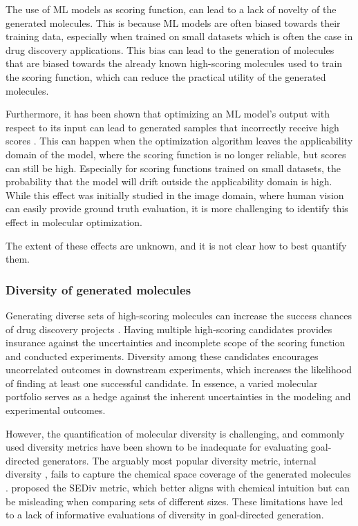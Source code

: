 The use of ML models as scoring function, can lead to a lack of novelty of the generated molecules. This is because ML
models are often biased towards their training data, especially when trained on small datasets which is often the case
in drug discovery applications. This bias can lead to the generation of molecules that are biased towards the already
known high-scoring molecules used to train the scoring function, which can reduce the practical utility of the generated
molecules.

Furthermore, it has been shown that optimizing an \ac{ML} model's output with respect to its input can lead to generated
samples that incorrectly receive high scores
\citep{szegedyIntriguingPropertiesNeural2014,goodfellowExplainingHarnessingAdversarial2015}. This can happen when the
optimization algorithm leaves the applicability domain of the model, where the scoring function is no longer reliable,
but scores can still be high. Especially for scoring functions trained on small datasets, the probability that the model
will drift outside the applicability domain is high. While this effect was initially studied in the image domain, where
human vision can easily provide ground truth evaluation, it is more challenging to identify this effect in molecular
optimization.

The extent of these effects are unknown, and it is not clear how to best quantify them.

\subsubsection{Diversity of generated molecules}
Generating diverse sets of high-scoring molecules can increase the success chances of drug discovery
projects \citep{martinDiverseViewpointsComputational2001,gorseDiversityMedicinalChemistry2006}.
Having multiple high-scoring candidates provides insurance against the uncertainties and incomplete
scope of the scoring function and conducted experiments. Diversity among these candidates encourages
uncorrelated outcomes in downstream experiments, which increases the likelihood of finding at least
one successful candidate. In essence, a varied molecular portfolio serves as a hedge against the
inherent uncertainties in the modeling and experimental outcomes.

However, the quantification of molecular diversity is challenging, and commonly used diversity
metrics have been shown to be inadequate for evaluating goal-directed generators. The
arguably most popular diversity metric, internal diversity
\citep{benhendaChemGANChallengeDrug2017}, fails to capture the chemical space coverage
of the generated molecules
\citep{waldmanNovelAlgorithmsOptimization2000,xieHowMuchSpace2023,thomasComparisonStructureLigandbased2021}.
\citet{thomasComparisonStructureLigandbased2021} proposed the \ac{SEDiv} metric, which better aligns
with chemical intuition but can be misleading when comparing sets of different sizes. These
limitations have led to a lack of informative evaluations of diversity in goal-directed generation.

